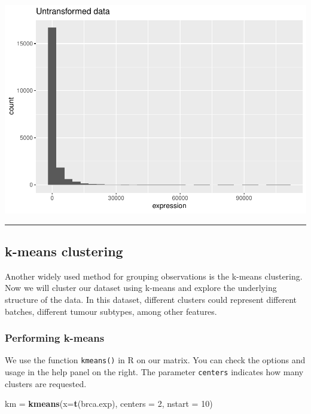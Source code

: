 \documentclass[
]{book}
\newenvironment{Shaded}{\begin{snugshade}}{\end{snugshade}}
\newcommand{\AttributeTok}[1]{\textcolor[rgb]{0.13,0.29,0.53}{#1}}
\newcommand{\DecValTok}[1]{\textcolor[rgb]{0.00,0.00,0.81}{#1}}
\newcommand{\FunctionTok}[1]{\textcolor[rgb]{0.13,0.29,0.53}{\textbf{#1}}}
\newcommand{\NormalTok}[1]{#1}
\newcommand{\OtherTok}[1]{\textcolor[rgb]{0.56,0.35,0.01}{#1}}
\begin{document}
\includegraphics{_main_files/figure-latex/unnamed-chunk-68-1.pdf}

\begin{center}\rule{0.5\linewidth}{0.5pt}\end{center}

\hypertarget{k-means-clustering}{%
\subsection{k-means clustering}\label{k-means-clustering}}

Another widely used method for grouping observations is the k-means clustering. Now we will cluster our dataset using k-means and explore the underlying structure of the data. In this dataset, different clusters could represent different batches, different tumour subtypes, among other features.

\hypertarget{performing-k-means}{%
\subsubsection{Performing k-means}\label{performing-k-means}}

We use the function \texttt{kmeans()} in R on our matrix. You can check the options and usage in the help panel on the right. The parameter \texttt{centers} indicates how many clusters are requested.

\begin{Shaded}
\begin{Highlighting}[]
\NormalTok{km }\OtherTok{=} \FunctionTok{kmeans}\NormalTok{(}\AttributeTok{x=}\FunctionTok{t}\NormalTok{(brca.exp), }
            \AttributeTok{centers =} \DecValTok{2}\NormalTok{, }
            \AttributeTok{nstart =} \DecValTok{10}\NormalTok{)}
\end{Highlighting}
\end{Shaded}
\end{document}

